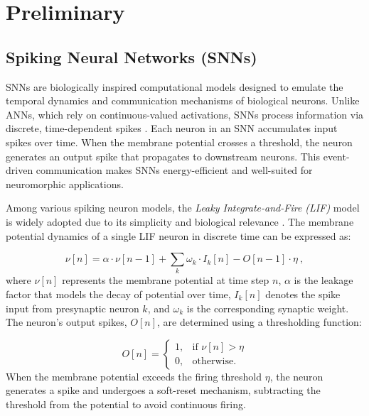\section{Preliminary}
\label{sec:preliminary}


\subsection{Spiking Neural Networks (SNNs)}

\noindent
SNNs are biologically inspired computational models designed to emulate the temporal dynamics and communication mechanisms of biological neurons. Unlike ANNs, which rely on continuous-valued activations, SNNs process information via discrete, time-dependent spikes \cite{schuman2022opportunities}. Each neuron in an SNN accumulates input spikes over time. When the membrane potential crosses a threshold, the neuron generates an output spike that propagates to downstream neurons. This event-driven communication makes SNNs energy-efficient and well-suited for neuromorphic applications.


Among various spiking neuron models, the \textit{Leaky Integrate-and-Fire (LIF)} model is widely adopted due to its simplicity and biological relevance \cite{izhikevich2004model}. The membrane potential dynamics of a single LIF neuron in discrete time can be expressed as:

\begin{equation}
    \nu[n] = \alpha \cdot \nu[n-1] + \sum_{k} \omega_k \cdot I_k[n] - O[n-1] \cdot \eta \ , 
\end{equation}
where $\nu[n]$ represents the membrane potential at time step $n$, $\alpha$ is the leakage factor that models the decay of potential over time, $I_k[n]$ denotes the spike input from presynaptic neuron $k$, and $\omega_k$ is the corresponding synaptic weight. The neuron’s output spikes, $O[n]$, are determined using a thresholding function:



\begin{equation}
    O[n] = 
    \begin{cases} 
        1, & \text{if } \nu[n] > \eta \\ 
        0, & \text{otherwise}.
    \end{cases}
    \label{eq:thresholding}
\end{equation}
When the membrane potential exceeds the firing threshold $\eta$, the neuron generates a spike and undergoes a soft-reset mechanism, subtracting the threshold from the potential to avoid continuous firing.

